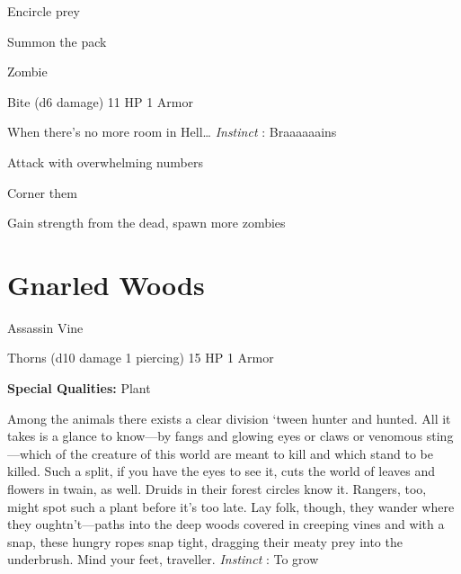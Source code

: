 \item Encircle prey

         
\item Summon the pack

       
\stopitemize
       
\startMonsterName
Zombie	 
\stopMonsterName
       

Bite (d6 damage)	11 HP	1 Armor

       


       
\startMonsterDescription
When there’s no more room in Hell… {\em Instinct} : Braaaaaains
\stopMonsterDescription
       
\startitemize[1,packed]
         
\item Attack with overwhelming numbers

         
\item Corner them

         
\item Gain strength from the dead, spawn more zombies

       
\stopitemize
                
\section{Gnarled Woods}    
            
\startMonsterName
Assassin Vine	 
\stopMonsterName
       

Thorns (d10 damage 1 piercing)	15 HP	1 Armor

       


       
\startMonsterQualities
         {\bf Special Qualities:}  Plant
\stopMonsterQualities
       
\startMonsterDescription
Among the animals there exists a clear division ‘tween hunter and hunted. All it takes is a glance to know—by fangs and glowing eyes or claws or venomous sting—which of the creature of this world are meant to kill and which stand to be killed. Such a split, if you have the eyes to see it, cuts the world of leaves and flowers in twain, as well. Druids in their forest circles know it. Rangers, too, might spot such a plant before it’s too late. Lay folk, though, they wander where they oughtn’t—paths into the deep woods covered in creeping vines and with a snap, these hungry ropes snap tight, dragging their meaty prey into the underbrush. Mind your feet, traveller. {\em Instinct} : To grow
\stopMonsterDescription
       
